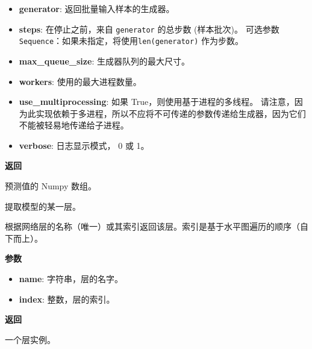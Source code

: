 \begin{itemize}
\tightlist
\item
  \textbf{generator}: 返回批量输入样本的生成器。
\item
  \textbf{steps}: 在停止之前，来自 \texttt{generator} 的总步数
  (样本批次)。 可选参数
  \texttt{Sequence}：如果未指定，将使用\texttt{len(generator)}
  作为步数。
\item
  \textbf{max\_queue\_size}: 生成器队列的最大尺寸。
\item
  \textbf{workers}: 使用的最大进程数量。
\item
  \textbf{use\_multiprocessing}: 如果 True，则使用基于进程的多线程。
  请注意，因为此实现依赖于多进程，所以不应将不可传递的参数传递给生成器，因为它们不能被轻易地传递给子进程。
\item
  \textbf{verbose}: 日志显示模式， 0 或 1。
\end{itemize}

\textbf{返回}

预测值的 Numpy 数组。



\label{getux5flayer}

\begin{Shaded}
\begin{Highlighting}[]
\OperatorTok{=}\OperatorTok{=}\NormalTok{)}
\end{Highlighting}
\end{Shaded}

提取模型的某一层。

根据网络层的名称（唯一）或其索引返回该层。索引是基于水平图遍历的顺序（自下而上）。

\textbf{参数}

\begin{itemize}
\tightlist
\item
  \textbf{name}: 字符串，层的名字。
\item
  \textbf{index}: 整数，层的索引。
\end{itemize}

\textbf{返回}

一个层实例。
\newpage
